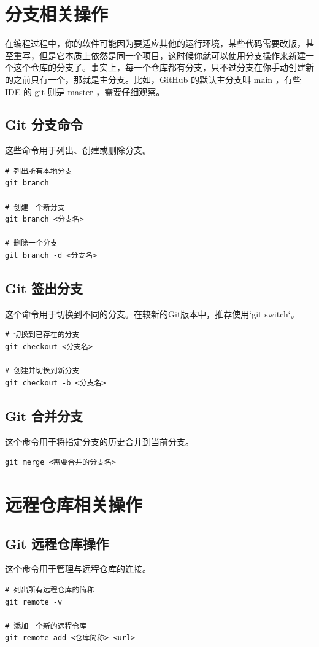 \documentclass[UTF8]{gyh}
\begin{document}
    \section{分支相关操作}

    在编程过程中，你的软件可能因为要适应其他的运行环境，某些代码需要改版，甚至重写，但是它本质上依然是同一个项目，这时候你就可以使用分支操作来新建一个这个仓库的分支了。事实上，每一个仓库都有分支，只不过分支在你手动创建新的之前只有一个，那就是主分支。比如，GitHub 的默认主分支叫 main ，有些 IDE 的 git 则是 master ，需要仔细观察。

    \subsection{Git 分支命令}
    这些命令用于列出、创建或删除分支。
    \begin{lstlisting}
# 列出所有本地分支
git branch

# 创建一个新分支
git branch <分支名>

# 删除一个分支
git branch -d <分支名>
    \end{lstlisting}

    \subsection{Git 签出分支}
    这个命令用于切换到不同的分支。在较新的Git版本中，推荐使用`git switch`。
    \begin{lstlisting}
# 切换到已存在的分支
git checkout <分支名>

# 创建并切换到新分支
git checkout -b <分支名>
    \end{lstlisting}

    \subsection{Git 合并分支}
    这个命令用于将指定分支的历史合并到当前分支。
    \begin{lstlisting}
git merge <需要合并的分支名>
    \end{lstlisting}

    \section{远程仓库相关操作}

    \subsection{Git 远程仓库操作}
    这个命令用于管理与远程仓库的连接。
    \begin{lstlisting}
# 列出所有远程仓库的简称
git remote -v

# 添加一个新的远程仓库
git remote add <仓库简称> <url>
    \end{lstlisting}
\end{document}
